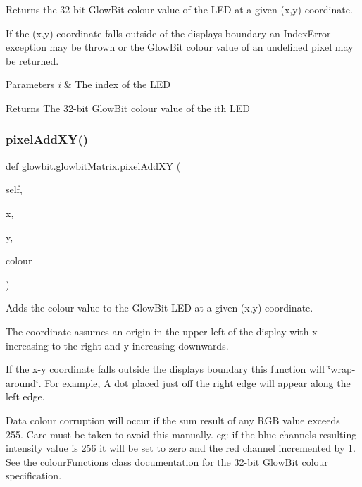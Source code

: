 Returns the 32-\/bit Glow\+Bit colour value of the L\+ED at a given (x,y) coordinate. 

If the (x,y) coordinate falls outside of the display\textquotesingle{}s boundary an Index\+Error exception may be thrown or the Glow\+Bit colour value of an undefined pixel may be returned.


\begin{DoxyParams}{Parameters}
{\em i} & The index of the L\+ED \\
\hline
\end{DoxyParams}
\begin{DoxyReturn}{Returns}
The 32-\/bit Glow\+Bit colour value of the i\textquotesingle{}th L\+ED 
\end{DoxyReturn}
\mbox{\label{classglowbit_1_1glowbitMatrix_ae05d008c207c5f5219e737d29185501e}} 
\subsubsection{\texorpdfstring{pixel\+Add\+X\+Y()}{pixelAddXY()}}
{\footnotesize\ttfamily def glowbit.\+glowbit\+Matrix.\+pixel\+Add\+XY (\begin{DoxyParamCaption}\item[{}]{self,  }\item[{}]{x,  }\item[{}]{y,  }\item[{}]{colour }\end{DoxyParamCaption})}



Adds the colour value to the Glow\+Bit L\+ED at a given (x,y) coordinate. 

The coordinate assumes an origin in the upper left of the display with x increasing to the right and y increasing downwards.

If the x-\/y coordinate falls outside the display\textquotesingle{}s boundary this function will \char`\"{}wrap-\/around\char`\"{}. For example, A dot placed just off the right edge will appear along the left edge.

Data colour corruption will occur if the sum result of any R\+GB value exceeds 255. Care must be taken to avoid this manually. eg\+: if the blue channel\textquotesingle{}s resulting intensity value is 256 it will be set to zero and the red channel incremented by 1. See the \hyperlink{classglowbit_1_1colourFunctions}{colour\+Functions} class documentation for the 32-\/bit Glow\+Bit colour specification.


